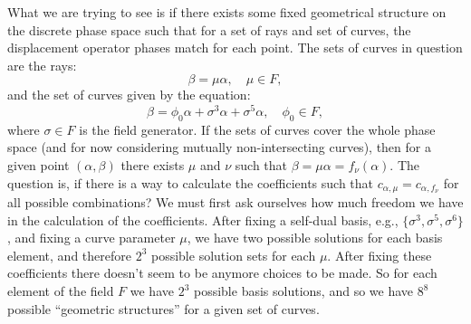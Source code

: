 \documentclass[a4paper]{article}
\begin{document}
  What we are trying to see is if there exists some fixed
  geometrical structure on the discrete phase space such
  that for a set of rays and set of curves, the displacement
  operator phases match for each point. The sets of curves
  in question are the rays:
  \begin{equation}
    \beta = \mu \alpha,
    \quad \mu \in F,
  \end{equation}
  and the set of curves given by the equation:
  \begin{equation}
    \beta = \phi_0 \alpha + \sigma^3 \alpha + \sigma^{5}
    \alpha,
    \quad \phi_0 \in F,
  \end{equation}
  where $\sigma \in F$ is the field generator. If the sets
  of curves cover the whole phase space (and for now
  considering mutually non-intersecting curves), then for a
  given point $(\alpha,\beta)$ there exists $\mu$ and $\nu$ 
  such that $\beta = \mu \alpha = f_\nu(\alpha)$. The
  question is, if there is a way to calculate the
  coefficients such that $c_{\alpha,\mu} = c_{\alpha,f_\nu}$
  for all possible combinations? We must first ask ourselves
  how much freedom we have in the calculation of the
  coefficients.  After fixing a self-dual basis, e.g.,
  $\{\sigma^3, \sigma^{5}, \sigma^{6}\}$, and fixing a curve
  parameter $\mu$, we have two possible solutions for each
  basis element, and therefore $2^3$ possible solution sets
  for each $\mu$. After fixing these coefficients there
  doesn't seem to be anymore choices to be made. So for each
  element of the field $F$ we have $2^{3}$ possible basis
  solutions, and so we have $8^8$ possible ``geometric
  structures'' for a given set of curves.
\end{document}

